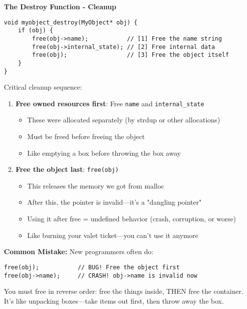 \textbf{The Destroy Function - Cleanup}

\begin{lstlisting}
void myobject_destroy(MyObject* obj) {
    if (obj) {
        free(obj->name);           // [1] Free the name string
        free(obj->internal_state); // [2] Free internal data
        free(obj);                 // [3] Free the object itself
    }
}
\end{lstlisting}

Critical cleanup sequence:

\begin{enumerate}
    \item \textbf{Free owned resources first}: Free \texttt{name} and \texttt{internal\_state}
    \begin{itemize}
        \item These were allocated separately (by strdup or other allocations)
        \item Must be freed before freeing the object
        \item Like emptying a box before throwing the box away
    \end{itemize}

    \item \textbf{Free the object last}: \texttt{free(obj)}
    \begin{itemize}
        \item This releases the memory we got from malloc
        \item After this, the pointer is invalid---it's a "dangling pointer"
        \item Using it after free = undefined behavior (crash, corruption, or worse)
        \item Like burning your valet ticket---you can't use it anymore
    \end{itemize}
\end{enumerate}

\begin{warningbox}
\textbf{Common Mistake:} New programmers often do:
\begin{lstlisting}
free(obj);           // BUG! Free the object first
free(obj->name);     // CRASH! obj->name is invalid now
\end{lstlisting}

You must free in reverse order: free the things inside, THEN free the container. It's like unpacking boxes---take items out first, then throw away the box.
\end{warningbox}

